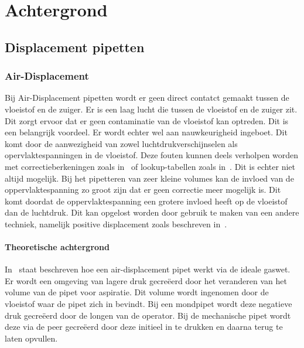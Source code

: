\chapter{Achtergrond}


\section{Displacement pipetten}
\subsection{Air-Displacement}
Bij Air-Displacement pipetten wordt er geen direct contatct gemaakt tussen de vloeistof en de zuiger. Er is een laag lucht die tussen de vloeistof en de zuiger zit. Dit zorgt ervoor dat er geen contaminatie van de vloeistof kan optreden. Dit is een belangrijk voordeel. Er wordt echter wel aan nauwkeurigheid ingeboet. Dit komt door de aanwezigheid van zowel luchtdrukverschijnselen als opervlaktespanningen in de vloeistof. Deze fouten kunnen deels verholpen worden met correctieberkeningen zoals in\ \cite{RN15} of lookup-tabellen zoals in\ \cite{RN35}. Dit is echter niet altijd mogelijk. Bij het pipetteren van zeer kleine volumes kan de invloed van de oppervlaktespanning zo groot zijn dat er geen correctie meer mogelijk is. Dit komt doordat de oppervlaktespanning een grotere invloed heeft op de vloeistof dan de luchtdruk. Dit kan opgelost worden door gebruik te maken van een andere techniek, namelijk positive displacement zoals beschreven in\ \cite{RN15}.
\subsubsection{Theoretische achtergrond}
In\ \cite{RN15} staat beschreven hoe een air-displacement pipet werkt via de ideale gaswet. Er wordt een omgeving van lagere druk gecreëerd door het veranderen van het volume van de pipet voor aspiratie. Dit volume wordt ingenomen door de vloeistof waar de pipet zich in bevindt. Bij een mondpipet wordt deze negatieve druk gecreëerd door de longen van de operator. Bij de mechanische pipet wordt deze via de peer gecreëerd door deze initieel in te drukken en daarna terug te laten opvullen.
